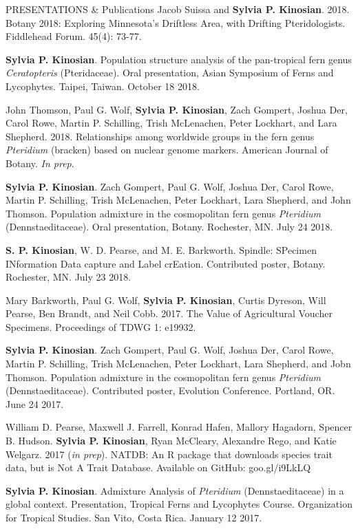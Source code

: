 \documentclass{resume} %
\begin{document}

\begin{rSection}{PRESENTATIONS \& Publications}
Jacob Suissa and \textbf{Sylvia P. Kinosian}. 2018. Botany 2018: Exploring Minnesota's Driftless Area, with Drifting Pteridologists. Fiddlehead Forum. 45(4): 73-77.

\textbf{Sylvia P. Kinosian}. Population structure analysis of the pan-tropical fern genus \textit{Ceratopteris} (Pteridaceae). Oral presentation, Asian Symposium of Ferns and Lycophytes. Taipei, Taiwan. October 18 2018.

John Thomson, Paul G. Wolf, \textbf{Sylvia P. Kinosian}, Zach Gompert, Joshua Der, Carol Rowe, Martin P. Schilling, Trish McLenachen, Peter Lockhart, and Lara Shepherd. 2018. Relationships among worldwide groups in the fern genus \textit{Pteridium} (bracken) based on nuclear genome markers. American Journal of Botany. \textit{In prep}.

\textbf{Sylvia P. Kinosian}. Zach Gompert, Paul G. Wolf, Joshua Der, Carol Rowe, Martin P. Schilling, Trish McLenachen, Peter Lockhart, Lara Shepherd, and John Thomson. Population admixture in the cosmopolitan fern genus \textit{Pteridium} (Dennstaeditaceae). Oral presentation, Botany. Rochester, MN. July 24 2018.

\textbf{S. P. Kinosian}, W. D. Pearse, and M. E. Barkworth. Spindle: SPecimen INformation Data capture and Label crEation. Contributed poster, Botany. Rochester, MN. July 23 2018.

Mary Barkworth, Paul G. Wolf, \textbf{Sylvia P. Kinosian}, Curtis Dyreson, Will Pearse, Ben Brandt, and Neil Cobb. 2017. The Value of Agricultural Voucher Specimens. Proceedings of TDWG 1: e19932.

\textbf{Sylvia P. Kinosian}. Zach Gompert, Paul G. Wolf, Joshua Der, Carol Rowe, Martin P. Schilling, Trish McLenachen, Peter Lockhart, Lara Shepherd, and Jobn Thomson. Population admixture in the cosmopolitan fern genus \textit{Pteridium} (Dennstaeditaceae). Contributed poster, Evolution Conference. Portland, OR. June 24 2017.

William D. Pearse, Maxwell J. Farrell, Konrad Hafen, Mallory Hagadorn, Spencer B. Hudson. \textbf{Sylvia P. Kinosian}, Ryan McCleary, Alexandre Rego, and Katie Welgarz. 2017 (\textit{in prep}). NATDB: An R package that downloads species trait data, but is Not A Trait Database. Available on GitHub: goo.gl/i9LkLQ

\textbf{Sylvia P. Kinosian}. Admixture Analysis of \textit{Pteridium} (Dennstaeditaceae) in a global context. Presentation, Tropical Ferns and Lycophytes Course. Organization for Tropical Studies. San Vito, Costa Rica. January 12 2017.


\end{rSection}
\end{document}
